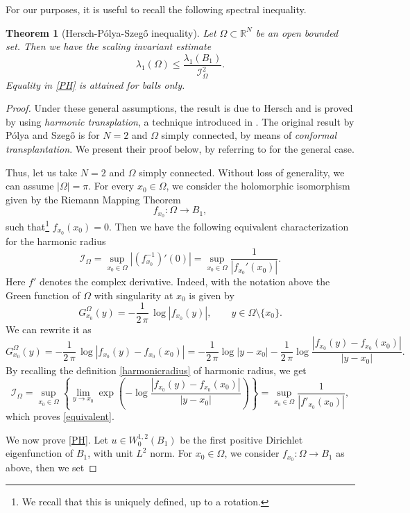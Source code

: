 \documentclass{amsart}
\newtheorem{theorem}[lemma]{Theorem}
\theoremstyle{definition}
\numberwithin{equation}{section}
\begin{document}
For our purposes, it is useful to recall the following spectral inequality.
\begin{theorem}[Hersch-P\'olya-Szeg\H{o} inequality]
Let $\Omega\subset\mathbb{R}^N$ be an open bounded set. Then we have the scaling invariant estimate
\begin{equation}
\label{PH}
\lambda_1(\Omega)\le \frac{\lambda_1(B_1)}{\mathcal{I}_\Omega^2}.
\end{equation}
Equality in \eqref{PH} is attained for balls only.
\end{theorem}
\begin{proof}
Under these general assumptions, the result is due to Hersch and is proved by using {\it harmonic transplation}, a technique introduced in \cite{MR0247572}. The original result by P\'olya and Szeg\H{o} is for $N=2$ and $\Omega$ simply connected, by means of {\it conformal transplantation}. We present their proof below, by referring to \cite[Section 6]{MR1391227} for the general case.
\par
Thus, let us take $N=2$ and $\Omega$ simply connected. Without loss of generality, we can assume $|\Omega|=\pi$. For every $x_0\in\Omega$, we consider the holomorphic isomorphism given by the Riemann Mapping Theorem
\[
f_{x_0}:\Omega\to B_1,
\] 
such that\footnote{We recall that this is uniquely defined, up to a rotation.} $f_{x_0}(x_0)=0$. Then we have the following equivalent characterization for the harmonic radius
\begin{equation}
\label{equivalent}
\mathcal{I}_\Omega=\sup_{x_0\in\Omega} \left|(f_{x_0}^{-1})'(0)\right|=\sup_{x_0\in\Omega} \frac{1}{|f_{x_0}'(x_0)|}.
\end{equation}
Here $f'$ denotes the complex derivative.
Indeed, with the notation above the Green function of $\Omega$ with singularity at $x_0$ is given by 
\[
G^\Omega_{x_0}(y)=-\frac{1}{2\,\pi}\,\log|f_{x_0}(y)|,\qquad y\in\Omega\setminus\{x_0\}.
\]
We can rewrite it as 
\[
G^\Omega_{x_0}(y)=-\frac{1}{2\,\pi}\, \log|f_{x_0}(y)-f_{x_0}(x_0)|=-\frac{1}{2\,\pi}\log|y-x_0|-\frac{1}{2\,\pi}\log\frac{|f_{x_0}(y)-f_{x_0}(x_0)|}{|y-x_0|}.
\]
By recalling the definition \eqref{harmonicradius} of harmonic radius, we get
\[
\mathcal{I}_\Omega=\sup_{x_0\in\Omega} \left\{\lim_{y\to x_0}\exp\left(-\log\frac{|f_{x_0}(y)-f_{x_0}(x_0)|}{|y-x_0|}\right)\right\}=\sup_{x_0\in\Omega} \frac{1}{|f'_{x_0}(x_0)|},
\]
which proves \eqref{equivalent}. 
\par
We now prove \eqref{PH}. Let $u\in W^{1,2}_0(B_1)$ be the first positive Dirichlet eigenfunction of $B_1$, with unit $L^2$ norm. For $x_0\in\Omega$, we consider $f_{x_0}:\Omega\to B_1$ as above, then we set

\end{proof}
\end{document}
